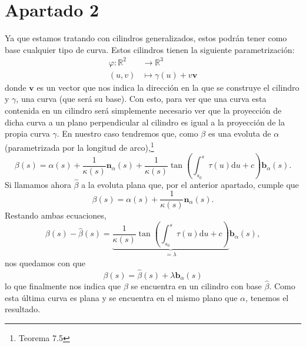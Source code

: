 \section{Apartado 2}
Ya que estamos tratando con cilindros generalizados, estos podrán tener como
base cualquier tipo de curva. Estos cilindros tienen la siguiente
parametrización:
\begin{align*}
    \varphi: \mathbb{R}^2 &\rightarrow \mathbb{R}^3\\
    \left( u, v \right) &\mapsto \gamma\left( u \right) + v \mathbf{v}
\end{align*}
donde $\mathbf{v}$ es un vector que nos indica la dirección en la que se
construye el cilindro y $\gamma$, una curva (que será su base). Con esto, para
ver que una curva esta contenida en un cilindro será simplemente necesario ver
que la proyección de dicha curva a un plano perpendicular al cilindro es igual a
la proyección de la propia curva $\gamma$. En nuestro caso tendremos que, como
$\beta$ es una evoluta de $\alpha$ (parametrizada por la longitud de
arco),\footnote{Teorema 7.5\cite{sanjurjo}}
\[
\beta\left( s \right) = \alpha\left( s \right) + \frac{1}{\kappa\left( s
\right)}\mathbf{n}_{\alpha}\left( s \right) + \frac{1}{\kappa\left( s \right)}
\tan\left( \int_{s_0}^{s} \tau\left( u \right) \mathrm{d}u + c \right)
\mathbf{b}_{\alpha}\left( s \right).
\]
Si llamamos ahora $\hat{\beta}$ a la evoluta plana que, por el anterior
apartado, cumple que
\[
\beta\left( s \right) = \alpha\left( s \right) + \frac{1}{\kappa\left( s
\right)} \mathbf{n}_{\alpha}\left( s \right).
\]
Restando ambas ecuaciones,
\[
\beta\left( s \right) - \hat{\beta}\left( s \right) =
\underbrace{\frac{1}{\kappa\left( s \right)} \tan\left( \int_{s_0}^{s}
\tau\left( u \right) \mathrm{d}u + c \right)}_{= \lambda}
\mathbf{b}_{\alpha}\left( s \right),
\]
nos quedamos con que
\[
\beta\left( s \right) = \hat{\beta}\left( s \right) + \lambda
\mathbf{b}_{\alpha}\left( s \right)
\]
lo que finalmente nos indica que $\beta$ se encuentra en un cilindro con base
$\hat{\beta}$. Como esta última curva es plana y se encuentra en el mismo plano
que $\alpha$, tenemos el resultado.
